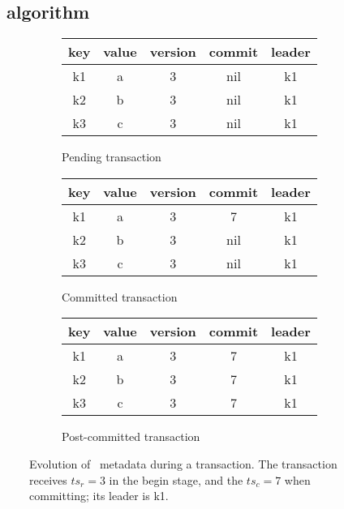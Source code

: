 	\subsection{\sys\ algorithm} 
\label{ssec:ll}

\begin{figure}[!t]
  \centering
  
  \begin{subfigure}[tb]{\columnwidth}
      \centering
    \begin{tabular}{|c|c|c|c|c|}
      \hline
      key & value & version & commit& leader\\
      \hline
      k1 & a & 3 & nil &k1\\
      k2 & b & 3 & nil &k1\\
      k3 & c & 3 & nil &k1\\
      \hline
    \end{tabular}
	\caption[]{Pending transaction}
    \label{fig:model:tentative}
  \end{subfigure}
  
  \begin{subfigure}[t]{\columnwidth}
    \centering
    \begin{tabular}{|c|c|c|c|c|}
      \hline
      key & value & version & commit& leader\\
      \hline
      k1 & a & 3 & 7&k1\\
      k2 & b & 3 & nil &k1\\
      k3 & c & 3 & nil &k1\\
      \hline
    \end{tabular}
	\caption[]{Committed transaction}
    \label{fig:model:committed}
  \end{subfigure}


  \begin{subfigure}[tb]{\columnwidth}
    \centering
    \begin{tabular}{|c|c|c|c|c|}
      \hline
      key & value & version & commit& leader\\
      \hline
      k1 & a & 3 & 7&k1\\
      k2 & b & 3 & 7&k1\\
      k3 & c & 3 & 7&k1\\
      \hline
    \end{tabular}
	\caption[]{Post-committed transaction}
    \label{fig:model:postcommit}
  \end{subfigure}

  
  \caption{Evolution of \sys\ metadata during a transaction. The transaction receives $ts_r=3$ in the begin stage, 
  and the $ts_c=7$ when committing; its leader is k1.}
  \label{fig:model}
\end{figure}


